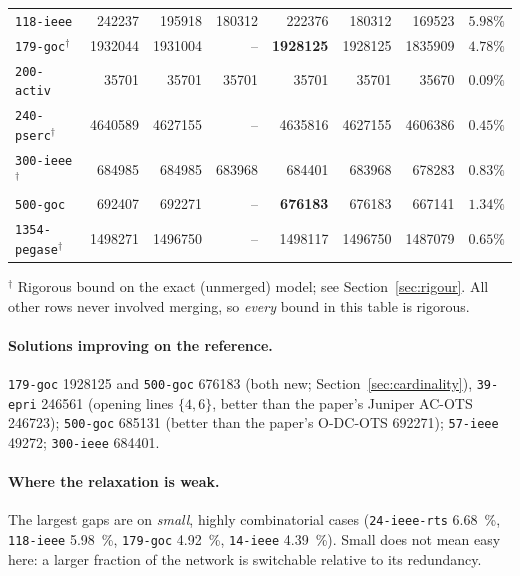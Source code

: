 \documentclass[11pt]{article}
\newcommand{\code}[1]{\texttt{\small #1}}
\begin{document}
\begin{longtable}{lrrrrrrl}
\code{118-ieee}      & \num{242237}  & \num{195918}  & \num{180312}  & \num{222376}  & \num{180312}  & \num{169523}  & $5.98\%$ \\
\code{179-goc}$^\dagger$    & \num{1932044} & \num{1931004} & --        & \textbf{\num{1928125}} & \num{1928125} & \num{1835909} & $4.78\%$ \\
\code{200-activ}     & \num{35701}   & \num{35701}   & \num{35701}   & \num{35701}   & \num{35701}   & \num{35670}   & $0.09\%$ \\
\code{240-pserc}$^\dagger$ & \num{4640589} & \num{4627155} & --      & \num{4635816} & \num{4627155} & \num{4606386} & $0.45\%$ \\
\code{300-ieee}$^\dagger$   & \num{684985} & \num{684985} & \num{683968} & \num{684401} & \num{683968} & \num{678283} & $0.83\%$ \\
\code{500-goc}       & \num{692407}  & \num{692271}  & --            & \textbf{\num{676183}}  & \num{676183}  & \num{667141}  & $1.34\%$ \\
\code{1354-pegase}$^\dagger$ & \num{1498271} & \num{1496750} & -- & \num{1498117} & \num{1496750} & \num{1487079} & $0.65\%$ \\
\bottomrule
\end{longtable}

\noindent
$^\dagger$ Rigorous bound on the exact (unmerged) model; see Section~\ref{sec:rigour}. All other rows
never involved merging, so \emph{every} bound in this table is rigorous.

\paragraph{Solutions improving on the reference.} \code{179-goc} \num{1928125} and \code{500-goc}
\num{676183} (both new; Section~\ref{sec:cardinality}), \code{39-epri} \num{246561} (opening lines $\{4,6\}$,
better than the paper's Juniper AC-OTS \num{246723}); \code{500-goc} \num{685131} (better than the
paper's O-DC-OTS \num{692271}); \code{57-ieee} \num{49272}; \code{300-ieee} \num{684401}.

\paragraph{Where the relaxation is weak.} The largest gaps are on \emph{small}, highly combinatorial
cases (\code{24-ieee-rts} \SI{6.68}{\percent}, \code{118-ieee} \SI{5.98}{\percent}, \code{179-goc}
\SI{4.92}{\percent}, \code{14-ieee} \SI{4.39}{\percent}). Small does not mean easy here: a larger
fraction of the network is switchable relative to its redundancy.
\end{document}
